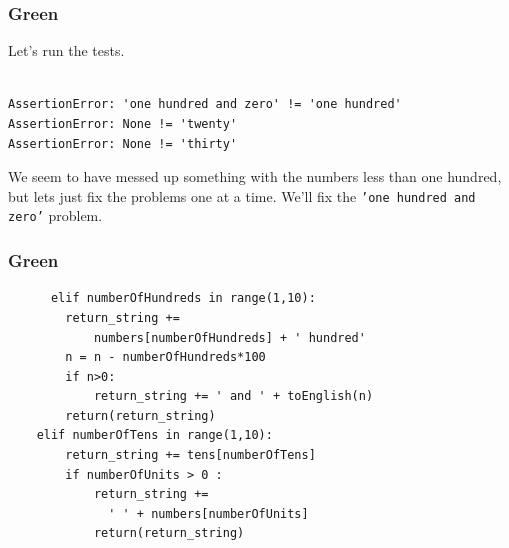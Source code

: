 \documentclass{beamer}
\begin{document}
\begin{frame}[fragile]
\frametitle{Green}
Let's run the tests.
\begin{verbatim}

AssertionError: 'one hundred and zero' != 'one hundred'
AssertionError: None != 'twenty'
AssertionError: None != 'thirty'
\end{verbatim}
We seem to have messed up something with the numbers less than one
hundred, but lets just fix the problems one at a time. We'll fix the
{\tt 'one hundred and zero'} problem.
\end{frame}
%
\begin{frame}[fragile]
\frametitle{Green}

\begin{lstlisting}
      elif numberOfHundreds in range(1,10):
        return_string += 
            numbers[numberOfHundreds] + ' hundred'
        n = n - numberOfHundreds*100
        if n>0:
            return_string += ' and ' + toEnglish(n)
        return(return_string)
    elif numberOfTens in range(1,10):
        return_string += tens[numberOfTens]
        if numberOfUnits > 0 :
            return_string += 
              ' ' + numbers[numberOfUnits]
            return(return_string)
\end{lstlisting}
\end{frame}
\end{document}
